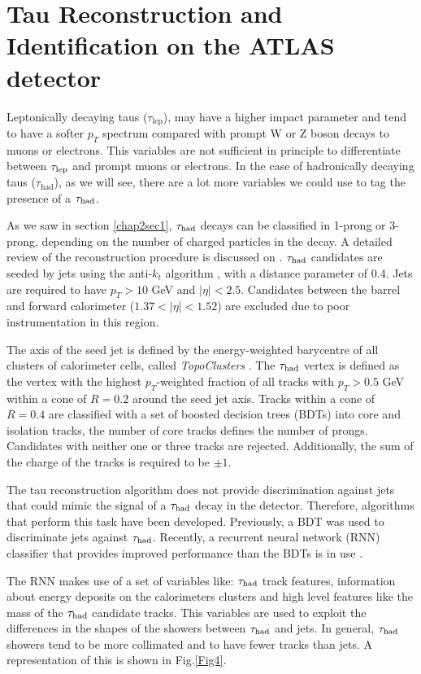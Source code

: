 \section{Tau Reconstruction and Identification on the ATLAS detector}
Leptonically decaying taus ($\tau_\text{lep}$), may have a higher impact parameter and tend to have a softer $p_T$ spectrum compared with prompt W or Z boson decays to muons or electrons. This variables are not sufficient in principle to differentiate between $\tau_\text{lep}$ and prompt muons or electrons. In the case of hadronically decaying taus ($\tau_\text{had}$), as we will see, there are a lot more variables we could use to tag the presence of a $\tau_\text{had}$.

As we saw in section \ref{chap2sec1}, $\tau_\text{had}$ decays can be classified in 1-prong or 3-prong, depending on the number of charged particles in the decay. A detailed review of the reconstruction procedure is discussed on \cite{Aad:2014rga}. $\tau_\text{had}$ candidates are seeded by jets using the anti-$k_t$ algorithm \cite{Cacciari:2008gp}, with a distance parameter of 0.4. Jets are required to have $p_T>10$ GeV and $|\eta|<2.5$. Candidates between the barrel and forward calorimeter ($1.37<|\eta|<1.52$) are excluded due to poor instrumentation in this region.

The axis of the seed jet is defined by the energy-weighted barycentre of all clusters of calorimeter cells, called \textit{TopoClusters} \cite{Aad:2016upy}. The $\tau_\text{had}$ vertex is defined as the vertex with the highest $p_T$-weighted fraction of all tracks with $p_T>0.5$ GeV within a cone of $R=0.2$ around the seed jet axis. Tracks within a cone of $R=0.4$ are classified with a set of boosted decision trees (BDTs) into core and isolation tracks, the number of core tracks defines the number of prongs. Candidates with neither one or three tracks are rejected. Additionally, the sum of the charge of the tracks is required to be $\pm 1$.     

The tau reconstruction algorithm does not provide discrimination against jets that could mimic the signal of a $\tau_\text{had}$ decay in the detector. Therefore, algorithms that perform this task have been developed. Previously, a BDT was used to discriminate jets against $\tau_\text{had}$. Recently, a recurrent neural network (RNN) classifier that provides improved performance than the BDTs is in use \cite{Deutsch:2680523}.

The RNN makes use of a set of variables like: $\tau_\text{had}$ track features, information about energy deposits on the calorimeters clusters and high level features like the mass of the $\tau_\text{had}$ candidate tracks. This variables are used to exploit the differences in the shapes of the showers between $\tau_\text{had}$ and jets. In general, $\tau_\text{had}$ showers tend to be more collimated and to have fewer tracks than jets. A representation of this is shown in Fig.\ref{Fig4}. 

